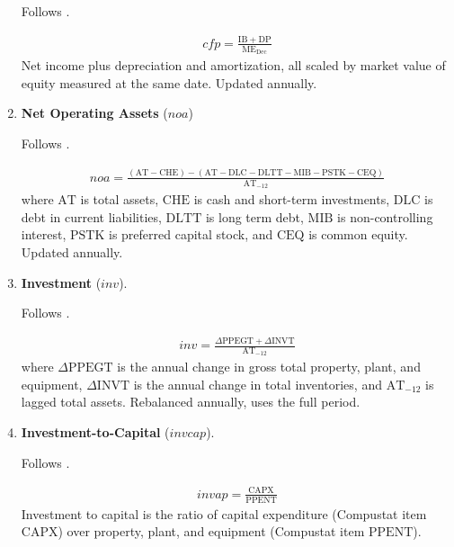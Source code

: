 \begin{enumerate}
	Follows . 
	
	\begin{align*}
		cfp = \frac{ \mathrm{IB} + \mathrm{DP} }{ \mathrm{ME}_{\text{Dec}} }
	\end{align*}
	Net income plus depreciation and amortization, all scaled by market value of equity measured at the same date. Updated annually.
	
	
	
	\item \textbf{Net Operating Assets} ($noa$)
	
	Follows .
	
	\begin{align*}
		noa = \frac{ ( \mathrm{AT} - \mathrm{CHE}) - (\mathrm{AT} - \mathrm{DLC} - \mathrm{DLTT} - \mathrm{MIB} - \mathrm{PSTK} - \mathrm{CEQ} ) }{ \mathrm{AT}_{-12} }
	\end{align*}
	where $\mathrm{AT}$ is total assets, $\mathrm{CHE}$ is cash and short-term investments, $\mathrm{DLC}$ is debt in current liabilities, $\mathrm{DLTT}$ is long term debt, $\mathrm{MIB}$ is non-controlling interest, $\mathrm{PSTK}$ is preferred capital stock, and $\mathrm{CEQ}$ is common equity. Updated annually.
	
	
	
	\item \textbf{Investment} ($inv$).
	
	Follows .
	
	\begin{align*}
	inv = \frac{ \Delta \mathrm{PPEGT} + \Delta \mathrm{INVT} }{ \mathrm{AT}_{-12} }
	\end{align*}
	where $\Delta \mathrm{PPEGT}$ is the annual change in gross total property, plant, and equipment, $\Delta \mathrm{INVT}$ is the annual change in total inventories, and $\mathrm{AT}_{-12}$ is lagged total assets. Rebalanced annually, uses the full period.
	
	
	
	\item \textbf{Investment-to-Capital} ($invcap$). 
	
	Follows . 
	
	\begin{align*}
		invap = \frac{ \mathrm{CAPX} }{ \mathrm{PPENT} }
	\end{align*}
	Investment to capital is the ratio of capital expenditure (Compustat item $\mathrm{CAPX}$) over property, plant, and equipment (Compustat item $\mathrm{PPENT}$).
	

\end{enumerate}
